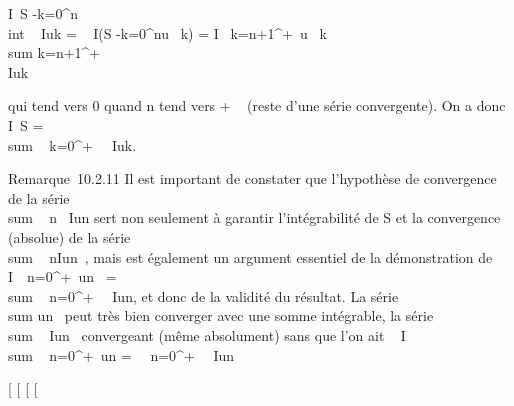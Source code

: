 \left \textbar{}\int  I~S
-\sum k=0^n~
\\int  ~
Iuk\right \textbar{} =
\left \textbar{}\int ~
I(S -\sum k=0^nu~
k)\right \textbar{} = \left
\textbar{}\int  I~
\sum k=n+1^+\infty~u~
k\right \textbar{}\leq\\sum
k=n+1^+\infty~\\\int
  I\textbar{}uk\textbar{}

qui tend vers 0 quand n tend vers + \infty~ (reste d'une série convergente).
On a donc \int  I~S
= \\sum ~
k=0^+\infty~\int ~
Iuk.

Remarque~10.2.11 Il est important de constater que l'hypothèse de
convergence de la série
\\sum ~
n\int ~
I\textbar{}un\textbar{} sert non seulement à garantir
l'intégrabilité de S et la convergence (absolue) de la série
\\sum ~
n\int  Iun~, mais est
également un argument essentiel de la démonstration de
\int  I~\
\sum  n=0^+\infty~un~
= \\sum ~
n=0^+\infty~\int ~
Iun, et donc de la validité du résultat. La série
\\sum  un~ peut
très bien converger avec une somme intégrable, la série
\\sum ~
\int  Iun~ convergeant (même
absolument) sans que l'on ait \int ~
I \\sum ~
n=0^+\infty~un =\
\sum ~
n=0^+\infty~\int ~
Iun

{[}
{[}
{[}
{[}
